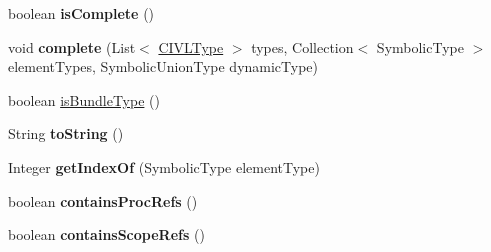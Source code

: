 \begin{DoxyCompactItemize}
\item 
\hypertarget{classedu_1_1udel_1_1cis_1_1vsl_1_1civl_1_1model_1_1common_1_1type_1_1CommonBundleType_a640a7911fd2c8e93d35a813efee80396}{}boolean {\bfseries is\+Complete} ()\label{classedu_1_1udel_1_1cis_1_1vsl_1_1civl_1_1model_1_1common_1_1type_1_1CommonBundleType_a640a7911fd2c8e93d35a813efee80396}

\item 
\hypertarget{classedu_1_1udel_1_1cis_1_1vsl_1_1civl_1_1model_1_1common_1_1type_1_1CommonBundleType_ad94cb72ac1e5cbbdde29ffa97c1656a8}{}void {\bfseries complete} (List$<$ \hyperlink{interfaceedu_1_1udel_1_1cis_1_1vsl_1_1civl_1_1model_1_1IF_1_1type_1_1CIVLType}{C\+I\+V\+L\+Type} $>$ types, Collection$<$ Symbolic\+Type $>$ element\+Types, Symbolic\+Union\+Type dynamic\+Type)\label{classedu_1_1udel_1_1cis_1_1vsl_1_1civl_1_1model_1_1common_1_1type_1_1CommonBundleType_ad94cb72ac1e5cbbdde29ffa97c1656a8}

\item 
boolean \hyperlink{classedu_1_1udel_1_1cis_1_1vsl_1_1civl_1_1model_1_1common_1_1type_1_1CommonBundleType_a7e0061f9529c034e0424a4944cd83b9e}{is\+Bundle\+Type} ()
\item 
\hypertarget{classedu_1_1udel_1_1cis_1_1vsl_1_1civl_1_1model_1_1common_1_1type_1_1CommonBundleType_a4c5e4f84085874a752b956173dd71d9e}{}String {\bfseries to\+String} ()\label{classedu_1_1udel_1_1cis_1_1vsl_1_1civl_1_1model_1_1common_1_1type_1_1CommonBundleType_a4c5e4f84085874a752b956173dd71d9e}

\item 
\hypertarget{classedu_1_1udel_1_1cis_1_1vsl_1_1civl_1_1model_1_1common_1_1type_1_1CommonBundleType_a9f05997657af7285bf6e4254acd7f380}{}Integer {\bfseries get\+Index\+Of} (Symbolic\+Type element\+Type)\label{classedu_1_1udel_1_1cis_1_1vsl_1_1civl_1_1model_1_1common_1_1type_1_1CommonBundleType_a9f05997657af7285bf6e4254acd7f380}

\item 
\hypertarget{classedu_1_1udel_1_1cis_1_1vsl_1_1civl_1_1model_1_1common_1_1type_1_1CommonBundleType_acdec273eb69de674c4ecdba114807c41}{}boolean {\bfseries contains\+Proc\+Refs} ()\label{classedu_1_1udel_1_1cis_1_1vsl_1_1civl_1_1model_1_1common_1_1type_1_1CommonBundleType_acdec273eb69de674c4ecdba114807c41}

\item 
\hypertarget{classedu_1_1udel_1_1cis_1_1vsl_1_1civl_1_1model_1_1common_1_1type_1_1CommonBundleType_a400972c0564a75004dac72e8e5cc71e8}{}boolean {\bfseries contains\+Scope\+Refs} ()\label{classedu_1_1udel_1_1cis_1_1vsl_1_1civl_1_1model_1_1common_1_1type_1_1CommonBundleType_a400972c0564a75004dac72e8e5cc71e8}


\end{DoxyCompactItemize}
